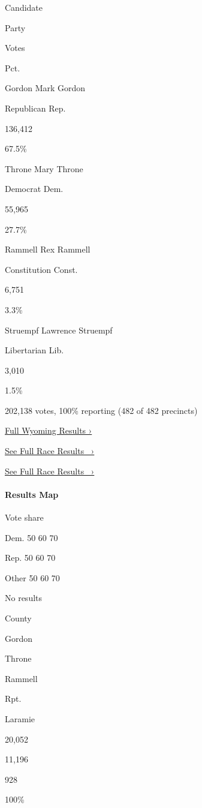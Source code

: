 Candidate

Party

Votes

Pct.

 Gordon Mark Gordon

Republican Rep.

136,412

67.5\%

 Throne Mary Throne

Democrat Dem.

55,965

27.7\%

 Rammell Rex Rammell

Constitution Const.

6,751

3.3\%

 Struempf Lawrence Struempf

Libertarian Lib.

3,010

1.5\%

202,138 votes, 100\% reporting (482 of 482 precincts)

\href{https://www.nytimes3xbfgragh.onion/interactive/2018/11/06/us/elections/results-wyoming-elections.html}{Full
Wyoming Results ›}

\href{https://www.nytimes3xbfgragh.onion/elections/results/wyoming-governor}{See
Full Race Results~ ›}

\href{https://www.nytimes3xbfgragh.onion/elections/results/wyoming-governor}{See
Full Race Results~ ›}

\hypertarget{results-map-2}{%
\paragraph{Results Map}\label{results-map-2}}

Vote share

Dem. 50 60 70

Rep. 50 60 70

Other 50 60 70

No results

County

Gordon

Throne

Rammell

Rpt.

Laramie

20,052

11,196

928

100\%

